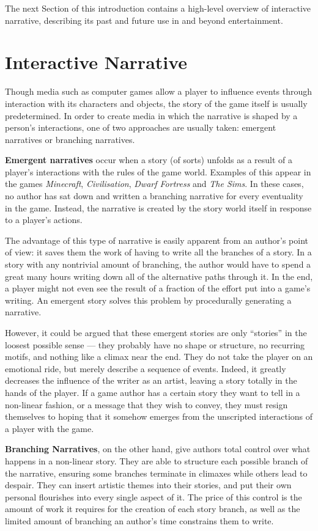 \documentclass[11pt]{report}
\begin{document}
The next Section of this introduction contains a high-level overview of
interactive narrative, describing its past and future use in and beyond entertainment.

\section{Interactive Narrative}
Though media such as computer games allow a player to influence events through
interaction with its characters and objects, the story of the game itself is
usually predetermined. In order to create media in which the narrative is shaped
by a person's interactions, one of two approaches are usually taken: emergent narratives or branching narratives.

\textbf{Emergent narratives} occur when a story (of sorts) unfolds as a result of a player's interactions with the rules of the game world. Examples of this appear in the games \emph{Minecraft}, \emph{Civilisation}, \emph{Dwarf Fortress} and \emph{The Sims}. In these cases, no author has sat down and written a branching narrative for every eventuality in the game. Instead, the narrative is created by the story world itself in response to a player's actions.

The advantage of this type of narrative is easily apparent from an author's point of view: it saves them the work of having to write all the branches of a story. In a story with any nontrivial amount of branching, the author would have to spend a great many hours writing down all of the alternative paths through it. In the end, a player might not even see the result of a fraction of the effort put into a game's writing. An emergent story solves this problem by procedurally generating a narrative.

However, it could be argued that these emergent stories are only ``stories'' in
the loosest possible sense --- they probably have no shape or structure, no recurring motifs, and nothing like a climax near the end. They do not take the player on an emotional ride, but merely describe a sequence of events. Indeed, it greatly decreases the influence of the writer as an artist, leaving a story totally in the hands of the player. If a game author has a certain story they want to tell in a non-linear fashion, or a message that they wish to convey, they must resign themselves to hoping that it somehow emerges from the unscripted interactions of a player with the game.

\textbf{Branching Narratives}, on the other hand, give authors total control over what happens in a non-linear story. They are able to structure each possible branch of the narrative, ensuring some branches terminate in climaxes while others lead to despair. They can insert artistic themes into their stories, and put their own personal flourishes into every single aspect of it. The price of this control is the amount of work it requires for the creation of each story branch, as well as the limited amount of branching an author's time constrains them to write.
\end{document}
